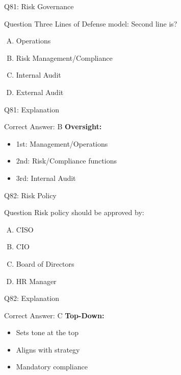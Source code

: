 \documentclass{beamer}
\begin{document}
			\begin{frame}{Q81: Risk Governance}
				\begin{block}{Question}
					Three Lines of Defense model: Second line is?
				\end{block}
				\begin{enumerate}[(A)]
					\item Operations
					\item Risk Management/Compliance
					\item Internal Audit
					\item External Audit
				\end{enumerate}
			\end{frame}
			\begin{frame}{Q81: Explanation}
				\begin{block}{Correct Answer: B}
					\textbf{Oversight:}
					\begin{itemize}
						\item 1st: Management/Operations
						\item 2nd: Risk/Compliance functions
						\item 3rd: Internal Audit
					\end{itemize}
				\end{block}
			\end{frame}
			
			\begin{frame}{Q82: Risk Policy}
				\begin{block}{Question}
					Risk policy should be approved by:
				\end{block}
				\begin{enumerate}[(A)]
					\item CISO
					\item CIO
					\item Board of Directors
					\item HR Manager
				\end{enumerate}
			\end{frame}
			\begin{frame}{Q82: Explanation}
				\begin{block}{Correct Answer: C}
					\textbf{Top-Down:}
					\begin{itemize}
						\item Sets tone at the top
						\item Aligns with strategy
						\item Mandatory compliance
					\end{itemize}
				\end{block}
			\end{frame}
			
\end{document}
